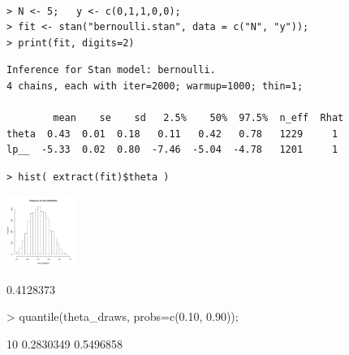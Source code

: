 \documentclass[10pt]{report}
\begin{document}
%
\\[-2pt]
\spc
\begin{minipage}[t]{\textwidth}
\footnotesize
\begin{Verbatim}
> N <- 5;   y <- c(0,1,1,0,0);
> fit <- stan("bernoulli.stan", data = c("N", "y"));
> print(fit, digits=2)
\end{Verbatim}
%
\vspace*{1pt}
%
\begin{Verbatim}[fontshape=sl]
Inference for Stan model: bernoulli.
4 chains, each with iter=2000; warmup=1000; thin=1;

        mean    se    sd   2.5%    50%  97.5%  n_eff  Rhat
theta  0.43  0.01  0.18   0.11   0.42   0.78   1229     1
lp__  -5.33  0.02  0.80  -7.46  -5.04  -4.78   1201     1
\end{Verbatim}
%
\vspace*{3pt}
%
\begin{Verbatim}
> hist( extract(fit)$theta )
\end{Verbatim}
\vspace*{-24pt}
\hfill\includegraphics[height=0.9in]{img/bernoulli-posterior-histo.pdf}
\hspace*{24pt}
\end{minipage}


%
\begin{codeout}
[1] 0.4128373
\end{codeout}
%
\begin{codein}
> quantile(theta_draws, probs=c(0.10, 0.90));
\end{codein}
\begin{codeout}
      10%
0.2830349 0.5496858
\end{codeout}
\end{document}
